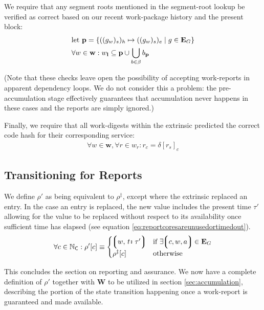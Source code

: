 We require that any segment roots mentioned in the segment-root lookup be verified as correct based on our recent work-package history and the present block:
\begin{align}
  &\text{let } \mathbf{p} = \{ ((g_w)_s)_h \mapsto ((g_w)_s)_e \mid g \in \mathbf{E}_G \} \\
  &\forall w \in \mathbf{w}: w_\mathbf{l} \subseteq \mathbf{p} \cup \bigcup_{b \in \beta} b_\mathbf{p}
\end{align}

(Note that these checks leave open the possibility of accepting work-reports in apparent dependency loops. We do not consider this a problem: the pre-accumulation stage effectively guarantees that accumulation never happens in these cases and the reports are simply ignored.)

Finally, we require that all work-digests within the extrinsic predicted the correct code hash for their corresponding service:
\begin{align}\label{eq:reportcodesarecorrect}
  \forall w \in \mathbf{w}, \forall r \in w_r : r_c = \delta[r_s]_c
\end{align}









\subsection{Transitioning for Reports}

We define $\rho'$ as being equivalent to $\rho^\ddagger$, except where the extrinsic replaced an entry. In the case an entry is replaced, the new value includes the present time $\tau'$ allowing for the value to be replaced without respect to its availability once sufficient time has elapsed (see equation \ref{eq:reportcoresareunusedortimedout}).
\begin{equation}
    \forall c \in \N_\mathsf{C} : \rho'[c] \equiv \begin{cases}
      \tup{w\ts\is{t}{\tau'}} &\when \exists \tup{c, w, a} \in \xtguarantees \\
      \rho^\ddagger[c] &\otherwise
    \end{cases}
\end{equation}

This concludes the section on reporting and assurance. We now have a complete definition of $\rho'$ together with $\mathbf{W}$ to be utilized in section \ref{sec:accumulation}, describing the portion of the state transition happening once a work-report is guaranteed and made available.
